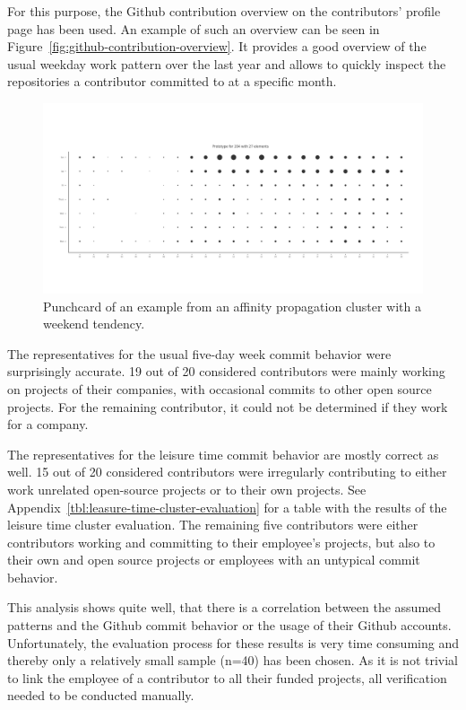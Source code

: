 For this purpose, the Github contribution overview on the contributors' profile page has been used.
An example of such an overview can be seen in Figure~\ref{fig:github-contribution-overview}.
It provides a good overview of the usual weekday work pattern over the last year and allows to quickly inspect the repositories a contributor committed to at a specific month.

\begin{figure}[H]
    \includegraphics[scale=0.32]{./graphs/analysis-affinity/204}
    \centering
    \caption{Punchcard of an example from an affinity propagation cluster with a weekend tendency.}\label{fig:leisure-time-hours}
\end{figure}

The representatives for the usual five-day week commit behavior were surprisingly accurate.
19 out of 20 considered contributors were mainly working on projects of their companies, with occasional commits to other open source projects.
For the remaining contributor, it could not be determined if they work for a company.



The representatives for the leisure time commit behavior are mostly correct as well.
15 out of 20 considered contributors were irregularly contributing to either work unrelated open-source projects or to their own projects.
See Appendix~\ref{tbl:leasure-time-cluster-evaluation} for a table with the results of the leisure time cluster evaluation.
The remaining five contributors were either contributors working and committing to their employee's projects, but also to their own and open source projects or employees with an untypical commit behavior.

This analysis shows quite well, that there is a correlation between the assumed patterns and the Github commit behavior or the usage of their Github accounts.
Unfortunately, the evaluation process for these results is very time consuming and thereby only a relatively small sample (n=40) has been chosen.
As it is not trivial to link the employee of a contributor to all their funded projects, all verification needed to be conducted manually.


